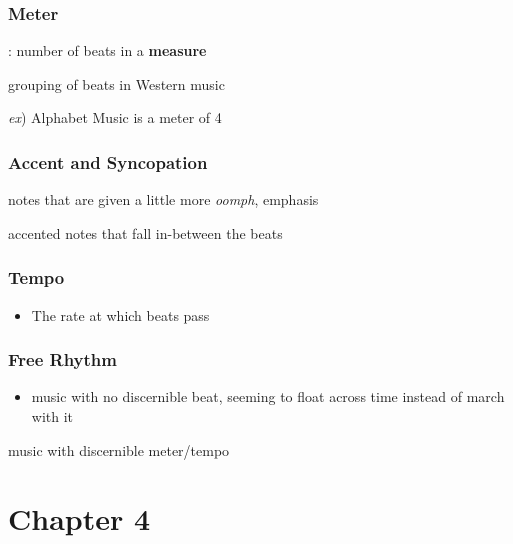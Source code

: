\documentclass[
  12pt,
]{article}
\providecommand{\tightlist}{%
  \setlength{\itemsep}{0pt}\setlength{\parskip}{0pt}}
\begin{document}
\subsection{Meter}\label{meter}

: number of beats in a \textbf{measure}

\begin{description}
\tightlist
\item[measure]
grouping of beats in Western music
\end{description}

\emph{ex}) Alphabet Music is a meter of 4

\subsection{Accent and Syncopation}\label{accent-and-syncopation}

\begin{description}
\tightlist
\item[accent]
notes that are given a little more \emph{oomph}, emphasis
\item[syncopation]
accented notes that fall in-between the beats
\end{description}

\subsection{Tempo}\label{tempo}

\begin{itemize}
\tightlist
\item
  The rate at which beats pass
\end{itemize}

\subsection{Free Rhythm}\label{free-rhythm}

\begin{itemize}
\tightlist
\item
  music with no discernible beat, seeming to float across time instead of march with it
\end{itemize}

\begin{description}
\tightlist
\item[metric music]
music with discernible meter/tempo
\end{description}

\chapter{Chapter 4}\label{chapter-4}
\end{document}
